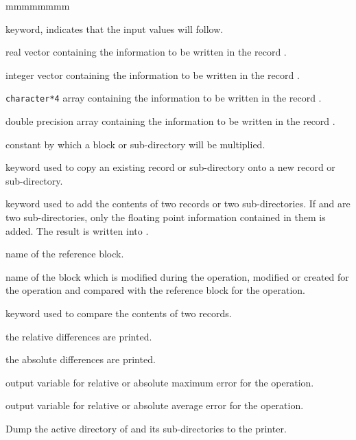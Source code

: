 \begin{ListeDeDescription}{mmmmmmmm}
\item[\moc{=}] keyword, indicates that the input values will follow.

\item[\dusa{valc}] real vector containing the information to be written in
the record .

\item[\dusa{ivalc}] integer vector containing the information to be written in
the record .

\item[\dusa{hvalc}] {\tt character*4} array containing the information to be
written in the record .

\item[\dusa{dvalc}] double precision array containing the information to be
written in the record .

\item[\dusa{flott}] constant by which a block or sub-directory will be
multiplied.

\item[\moc{COPY}] keyword used to copy an existing record or sub-directory
onto a new record or sub-directory.

\item[\moc{ADD}] keyword used to add the contents of two records or two
sub-directories. If  and  are two
sub-directories, only the floating point information contained in them is added.
The result is written into .

\item[\dusa{NOMREF}] name of the reference block.

\item[\dusa{NOMALT}] name of the block which is modified during the  operation, modified or created
for the  operation and compared with the reference block for the  operation.

\item[\moc{STAT}] keyword used to compare the contents of two records.

\item[\moc{REL}] the relative differences are printed.

\item[\moc{ABS}] the absolute differences are printed.

\item[\dusa{errmax}] output variable for relative or absolute maximum error for the  operation.

\item[\dusa{erravg}] output variable for relative or absolute average error for the  operation.

\item[\moc{DUMP}] Dump the active directory of and its
sub-directories to the printer.

\end{ListeDeDescription}


